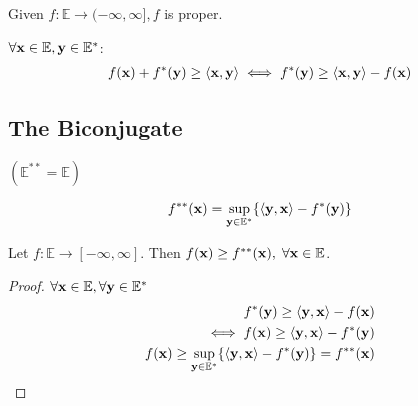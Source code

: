 \documentclass[11pt]{article}
\begin{document}
\begin{theorem}
    Given $f: \mathbb{E} \to (-\infty,\infty], f$ is proper.

    $\forall {\mathbf{x}} \in \mathbb{E}, {\mathbf{y}} \in \mathbb{E}^{*}$:
    \begin{align*}
        f({\mathbf{x}}) + f^{*}({\mathbf{y}}) \ge \langle {\mathbf{x}} ,{\mathbf{y}}\rangle 
        \iff f^{*}({\mathbf{y}}) \ge \langle {\mathbf{x}},{\mathbf{y}} \rangle - f({\mathbf{x}})
    \end{align*}
\end{theorem}

\subsection{The Biconjugate}
$(\mathbb{E}^{**} = \mathbb{E})$

\begin{definition}
    \begin{align*}
        f^{**}({\mathbf{x}}) = \sup_{{\mathbf{y}} \in \mathbb{E}^{*}}\{ \langle {\mathbf{y}},{\mathbf{x}} \rangle - f^{*}({\mathbf{y}}) \}
    \end{align*}
\end{definition}

\begin{lemma}[$f^{** }\le f$]
    Let $f: \mathbb{E} \to [-\infty,\infty]$. Then $f({\mathbf{x}}) \ge f^{**}({\mathbf{x}}), \; \forall {\mathbf{x}} \in \mathbb{E}$.
\end{lemma}
\begin{proof}
    $\forall {\mathbf{x}} \in \mathbb{E}, \forall {\mathbf{y}} \in \mathbb{E}^{*}$
    \begin{align*}
        f^{*}({\mathbf{y}}) \ge \langle {\mathbf{y}},{\mathbf{x}} \rangle - f({\mathbf{x}}) \\
        \iff f({\mathbf{x}}) \ge \langle {\mathbf{y}}, {\mathbf{x}} \rangle - f^{*}({\mathbf{y}}) \\
        f({\mathbf{x}}) \ge \sup_{{\mathbf{y}} \in \mathbb{E}^{*}}\{ \langle {\mathbf{y}},{\mathbf{x}} \rangle - f^{*}({\mathbf{y}}) \}
            = f^{**}({\mathbf{x}})
    \end{align*}
\end{proof}

\begin{theorem}[$f^{**} = f$ whenever $f$ is proper, closed and convex]
    
\end{theorem}
\end{document}

